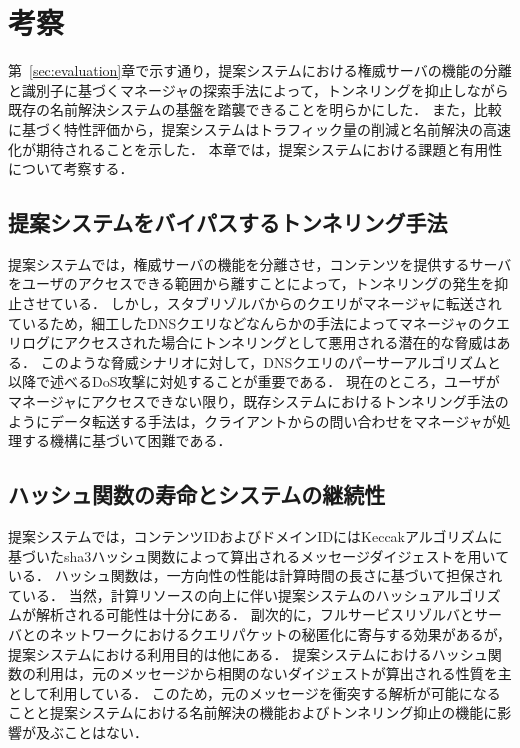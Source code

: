 \section{考察}
第~\ref{sec:evaluation}章で示す通り，提案システムにおける権威サーバの機能の分離と識別子に基づくマネージャの探索手法によって，トンネリングを抑止しながら既存の名前解決システムの基盤を踏襲できることを明らかにした．
また，比較に基づく特性評価から，提案システムはトラフィック量の削減と名前解決の高速化が期待されることを示した．
本章では，提案システムにおける課題と有用性について考察する．

\subsection{提案システムをバイパスするトンネリング手法}
提案システムでは，権威サーバの機能を分離させ，コンテンツを提供するサーバをユーザのアクセスできる範囲から離すことによって，トンネリングの発生を抑止させている．
しかし，スタブリゾルバからのクエリがマネージャに転送されているため，細工したDNSクエリなどなんらかの手法によってマネージャのクエリログにアクセスされた場合にトンネリングとして悪用される潜在的な脅威はある．
このような脅威シナリオに対して，DNSクエリのパーサーアルゴリズムと以降で述べるDoS攻撃に対処することが重要である．
現在のところ，ユーザがマネージャにアクセスできない限り，既存システムにおけるトンネリング手法のようにデータ転送する手法は，クライアントからの問い合わせをマネージャが処理する機構に基づいて困難である．


\subsection{ハッシュ関数の寿命とシステムの継続性}
提案システムでは，コンテンツIDおよびドメインIDにはKeccakアルゴリズムに基づいたsha3ハッシュ関数によって算出されるメッセージダイジェストを用いている．
ハッシュ関数は，一方向性の性能は計算時間の長さに基づいて担保されている．
当然，計算リソースの向上に伴い提案システムのハッシュアルゴリズムが解析される可能性は十分にある．
副次的に，フルサービスリゾルバとサーバとのネットワークにおけるクエリパケットの秘匿化に寄与する効果があるが，提案システムにおける利用目的は他にある．
提案システムにおけるハッシュ関数の利用は，元のメッセージから相関のないダイジェストが算出される性質を主として利用している．
このため，元のメッセージを衝突する解析が可能になることと提案システムにおける名前解決の機能およびトンネリング抑止の機能に影響が及ぶことはない．

